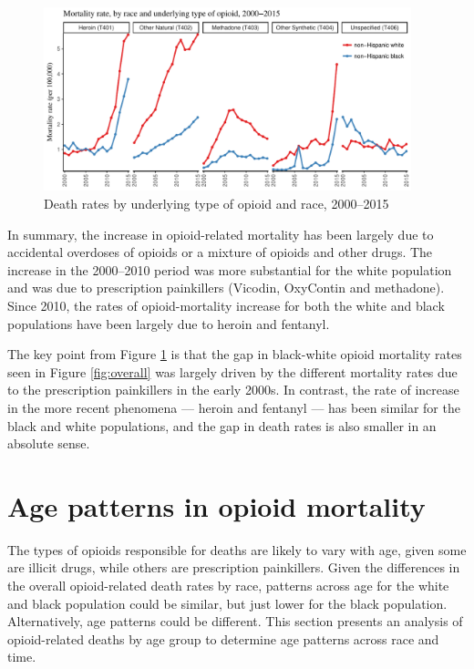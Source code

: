 \documentclass[12pt, a4paper]{article}
\begin{document}
\begin{figure}[h!]
 \centering
\includegraphics[width=0.95\textwidth]{./plots/paper_fig4_t40_adjusted_race_lines.pdf} 
 \caption{Death rates by underlying type of opioid and race, 2000--2015}
 \label{fig:opioid_race}
\end{figure}

In summary, the increase in opioid-related mortality has been largely due to accidental overdoses of opioids or a mixture of opioids and other drugs. The increase in the 2000--2010 period was more substantial for the white population and was due to prescription painkillers (Vicodin, OxyContin and methadone). Since 2010, the rates of opioid-mortality increase for both the white and black populations have been largely due to heroin and fentanyl. 

The key point from Figure \ref{fig:opioid_race} is that the gap in black-white opioid mortality rates seen in Figure \ref{fig:overall} was largely driven by the different mortality rates due to the prescription painkillers in the early 2000s. In contrast, the rate of increase in the more recent phenomena --- heroin and fentanyl --- has been similar for the black and white populations, and the gap in death rates is also smaller in an absolute sense. 

\section{Age patterns in opioid mortality} \label{section:age}
The types of opioids responsible for deaths are likely to vary with age, given some are illicit drugs, while others are prescription painkillers. Given the differences in the overall opioid-related death rates by race, patterns across age for the white and black population could be similar, but just lower for the black population. Alternatively, age patterns could be different. This section presents an analysis of opioid-related deaths by age group to determine age patterns across race and time. 
\end{document}
